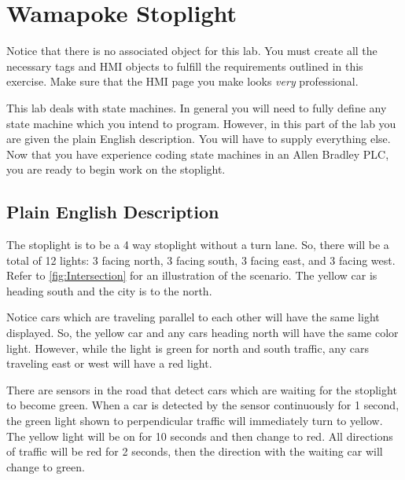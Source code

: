 
\TASignatureSlot





\section{Wamapoke Stoplight}
Notice that there is no associated object for this lab. You must create all the necessary tags and HMI objects to fulfill the requirements outlined in this exercise. Make sure that the HMI page you make looks \textit{very} professional. 

This lab deals with state machines. In general you will need to fully define any state machine which you intend to program. However, in this part of the lab you are given the plain English description. You will have to supply everything else.
\\

Now that you have experience coding state machines in an Allen Bradley PLC, you are ready to begin work on the stoplight. 


\subsection{Plain English Description}

The stoplight is to be a 4 way stoplight without a turn lane. So, there will be a total of 12 lights: 3 facing north, 3 facing south, 3 facing east, and 3 facing west. Refer to \figureautorefname \ref{fig:Intersection} for an illustration of the scenario. The yellow car is heading south and the city is to the north.

Notice cars which are traveling parallel to each other will have the same light displayed. So, the yellow car and any cars heading north will have the same color light. However, while the light is green for north and south traffic, any cars traveling east or west will have a red light. 

There are sensors in the road that detect cars which are waiting for the stoplight to become green. When a car is detected by the sensor continuously for 1 second, the green light shown to perpendicular traffic will immediately turn to yellow. The yellow light will be on for 10 seconds and then change to red. All directions of traffic will be red for 2 seconds, then the direction with the waiting car will change to green.

